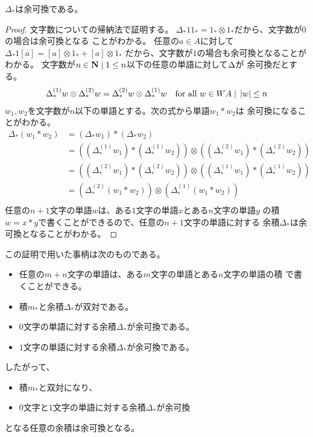 	\begin{proposition}\label{prop:Delta_*は余可換} %
		$\Delta_*$は余可換である。
	\end{proposition} %
	\begin{proof} %
		文字数についての帰納法で証明する。
		$\Delta_*11_*=1_*\otimes 1_*$だから、文字数が$0$の場合は余可換となる
		ことがわかる。
		任意の$a\in A$に対して$\Delta_*1[a]=[a]\otimes 1_*+[a]\otimes 1_*$
		だから、文字数が$1$の場合も余可換となることがわかる。
		文字数が$n\in{\mathbf{N}}\;\vert\; 1\le n$以下の任意の単語に対して$\Delta\*$が
		余可換だとする。
		\begin{equation*}\begin{split} %
			\Delta_*^{(1)}w\otimes\Delta_*^{(2)}w
			=\Delta_*^{(2)}w\otimes\Delta_*^{(1)}w
			\quad\text{for all }w\in WA\bou \zettai{w}\le n
		\end{split}\end{equation*} %
		$w_1,w_2$を文字数が$n$以下の単語とする。次の式から単語$w_1*w_2$は
		余可換になることがわかる。
		\begin{equation*}\begin{split} %
			\Delta_*(w_1*w_2) &= (\Delta_*w_1)*(\Delta_*w_2) \\
			&= \left((\Delta_*^{(1)}w_1)*(\Delta_*^{(1)}w_2)\right)
			\otimes \left((\Delta_*^{(2)}w_1)*(\Delta_*^{(2)}w_2)\right) \\
			&= \left((\Delta_*^{(2)}w_1)*(\Delta_*^{(2)}w_2)\right)
			\otimes \left((\Delta_*^{(1)}w_1)*(\Delta_*^{(1)}w_2)\right) \\
			& = \left(\Delta_*^{(2)}(w_1*w_2)\right)
			\otimes \left(\Delta_*^{(1)}(w_1*w_2)\right) \\
		\end{split}\end{equation*} %
		任意の$n+1$文字の単語$w$は、ある$1$文字の単語$x$とある$n$文字の単語$y$
		の積$w=x*y$で書くことができるので、任意の$n+1$文字の単語に対する
		余積$\Delta_*$は余可換となることがわかる。
	\end{proof} %

	この証明で用いた事柄は次のものである。
	\begin{itemize} %
		\item 任意の$m+n$文字の単語は、ある$m$文字の単語とある$n$文字の単語の積
		で書くことができる。
		\item 積$m_*$と余積$\Delta_*$が双対である。
		\item $0$文字の単語に対する余積$\Delta_*$が余可換である。
		\item $1$文字の単語に対する余積$\Delta_*$が余可換である。
	\end{itemize} %
	したがって、
	\begin{itemize} %
		\item 積$m_*$と双対になり、
		\item $0$文字と$1$文字の単語に対する余積$\Delta_*$が余可換
	\end{itemize} %
	となる任意の余積は余可換となる。

